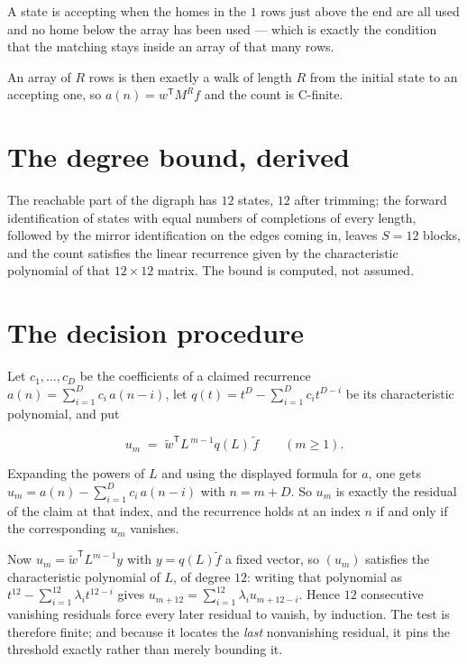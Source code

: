 \documentclass[11pt]{article}
\theoremstyle{definition}
\begin{document}
A state is accepting when the homes in the $1$ rows just above the end are all used and no home below the array has been used --- which is exactly the condition that the matching stays inside an array of that many rows.

An array of $R$ rows is then exactly a walk of length $R$ from the initial state to an accepting one, so $a(n) = w^{\mathsf T}M^{R}f$ and the count is C-finite.

\section{The degree bound, derived}

The reachable part of the digraph has $12$ states, $12$ after trimming; the forward identification of states with equal numbers of completions of every length, followed by the mirror identification on the edges coming in, leaves $S = 12$ blocks, and the count satisfies the linear recurrence given by the characteristic polynomial of that $12\times12$ matrix. The bound is computed, not assumed.

\section{The decision procedure}

Let $c_1,\dots,c_D$ be the coefficients of a claimed recurrence $a(n) = \sum_{i=1}^{D} c_i\,a(n-i)$, let $q(t) = t^{D} - \sum_{i=1}^{D} c_i t^{D-i}$ be its characteristic polynomial, and put

\[u_m \;=\; \tilde w^{\mathsf T} L^{\,m-1} q(L)\,\tilde f \qquad (m \ge 1).\]

Expanding the powers of $L$ and using the displayed formula for $a$, one gets $u_m = a(n) - \sum_{i=1}^{D} c_i\,a(n-i)$ with $n = m + D$. So $u_m$ is exactly the residual of the claim at that index, and the recurrence holds at an index $n$ if and only if the corresponding $u_m$ vanishes.

Now $u_m = \tilde w^{\mathsf T} L^{m-1} y$ with $y = q(L)\tilde f$ a fixed vector, so $(u_m)$ satisfies the characteristic polynomial of $L$, of degree $12$: writing that polynomial as $t^{12} - \sum_{i=1}^{12} \lambda_i t^{12-i}$ gives $u_{m+12} = \sum_{i=1}^{12} \lambda_i u_{m+12-i}$. Hence $12$ consecutive vanishing residuals force every later residual to vanish, by induction. The test is therefore finite; and because it locates the {\itshape last} nonvanishing residual, it pins the threshold exactly rather than merely bounding it.
\end{document}
